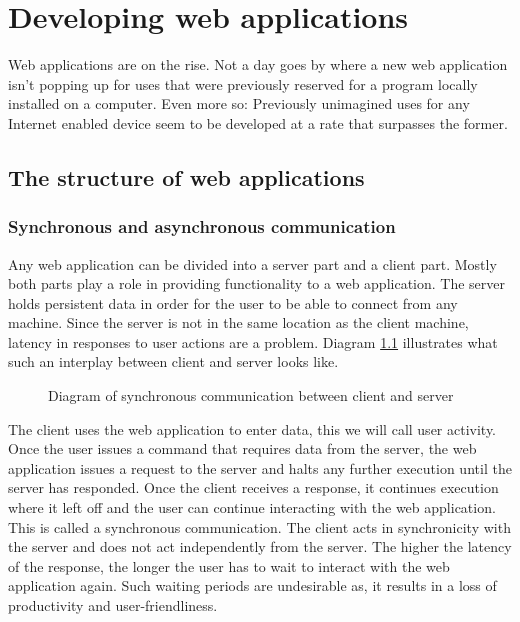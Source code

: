 \documentclass[thesis.tex]{subfiles}
\begin{document}
\chapter{Developing web applications}
\label{chap:webapps}
Web applications are on the rise. Not a day goes by where a new
web application isn't popping up for uses that were previously reserved for a
program locally installed on a computer. Even more so: Previously
unimagined uses for any Internet enabled device seem to be developed
at a rate that surpasses the former.

\section{The structure of web applications}
\subsection{Synchronous and asynchronous communication}
Any web application can be divided into a server part and a client part.
Mostly both parts play a role in providing functionality to a web application.
The server holds persistent data in order for the user to be able to connect
from any machine. Since the server is not in the same location as the
client machine, latency in responses to user actions are a problem.
Diagram \ref{fig:synchronous} illustrates what such an interplay between client
and server looks like.

\begin{figure}
	\centering
	\resizebox{\linewidth}{!}{}
	\caption{Diagram of synchronous communication between client and server}
	\label{fig:synchronous}
\end{figure}

The client uses the web application to enter data, this we will
call user activity. Once the user issues a command that requires data from the
server, the web application issues a request to the server and halts any further
execution until the server has responded.
Once the client receives a response, it continues execution
where it left off and the user can continue interacting with the web application.
This is called a synchronous communication. The client acts in
synchronicity with the server and does not act independently from the server.
The higher the latency of the response, the longer the user has to wait to
interact with the web application again.
Such waiting periods are undesirable as, it results in a loss of productivity
and user-friendliness.
\end{document}
